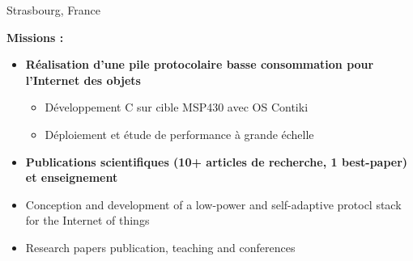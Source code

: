 \vspace{\ItemsSpacing}

{}{}{Strasbourg, France}{
\textcolor{color1}{\textbf{Missions :}}
\begin{itemize}
\ifnativelang
\item \textbf{R\'ealisation d'une pile protocolaire basse consommation pour l'Internet des objets}
\begin{itemize}
\item D\'eveloppement C sur cible MSP430 avec OS Contiki
\item D\'eploiement et étude de performance \`a grande \'echelle
\end{itemize}
\item \textbf{Publications scientifiques (10+ articles de recherche, 1 best-paper) et enseignement}
\else
\item Conception and development of a low-power and self-adaptive protocl stack for the Internet of things
\item Research papers publication, teaching and conferences
\fi
\end{itemize}
}


